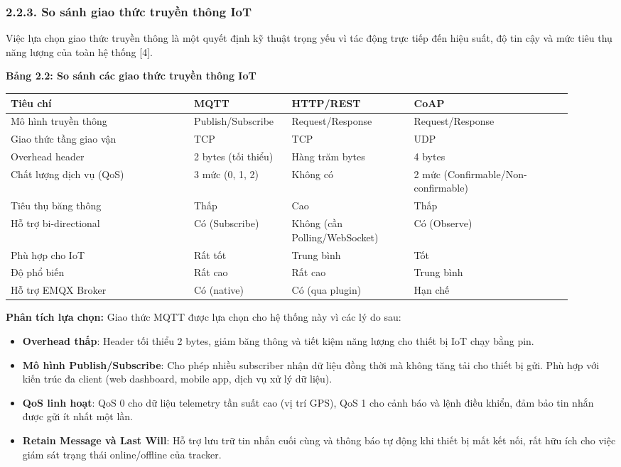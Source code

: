 \documentclass[13pt,a4paper]{extarticle}
\newcounter{none} %
\newcommand{\thesislongtableorignewline}{}
\let\thesislongtableorignewline\\
\renewcommand{\\}{\thesislongtableorignewline\hline}%
\let\\\thesislongtableorignewline
\newcommand{\thesistabletitle}[1]{%
  \begin{center}\textbf{#1}\end{center}%
}
\providecommand{\tightlist}{%
  \setlength{\itemsep}{0pt}\setlength{\parskip}{0pt}}
\begin{document}
\subsubsection{2.2.3. So sánh giao thức truyền thông
IoT}\label{223-so-suxe1nh-giao-thux1ee9c-truyux1ec1n-thuxf4ng-iot}

Việc lựa chọn giao thức truyền thông là một quyết định kỹ thuật trọng
yếu vì tác động trực tiếp đến hiệu suất, độ tin cậy và mức tiêu thụ năng
lượng của toàn hệ thống {[}4{]}.

\thesistabletitle{Bảng 2.2: So sánh các giao thức truyền thông IoT}

{\def\LTcaptype{none} %
\begin{longtable}{|p{0.30\linewidth}|p{0.16\linewidth}|p{0.20\linewidth}|p{0.26\linewidth}|}
\hline \textbf{Tiêu chí} & \textbf{MQTT} & \textbf{HTTP/REST} & \textbf{CoAP} \\
\hline
\endhead
\hline
\endlastfoot
Mô hình truyền thông & Publish/Subscribe & Request/Response &
Request/Response \\
Giao thức tầng giao vận & TCP & TCP & UDP \\
Overhead header & 2 bytes (tối thiểu) & Hàng trăm bytes & 4 bytes \\
Chất lượng dịch vụ (QoS) & 3 mức (0, 1, 2) & Không có & 2 mức
(Confirmable/Non-confirmable) \\
Tiêu thụ băng thông & Thấp & Cao & Thấp \\
Hỗ trợ bi-directional & Có (Subscribe) & Không (cần Polling/WebSocket) &
Có (Observe) \\
Phù hợp cho IoT & Rất tốt & Trung bình & Tốt \\
Độ phổ biến & Rất cao & Rất cao & Trung bình \\
Hỗ trợ EMQX Broker & Có (native) & Có (qua plugin) & Hạn chế \\
\end{longtable}
}

\textbf{Phân tích lựa chọn:} Giao thức MQTT được lựa chọn cho hệ thống
này vì các lý do sau:

\begin{itemize}
\tightlist
\item
  \textbf{Overhead thấp}: Header tối thiểu 2 bytes, giảm băng thông và
  tiết kiệm năng lượng cho thiết bị IoT chạy bằng pin.
\item
  \textbf{Mô hình Publish/Subscribe}: Cho phép nhiều subscriber nhận dữ
  liệu đồng thời mà không tăng tải cho thiết bị gửi. Phù hợp với kiến
  trúc đa client (web dashboard, mobile app, dịch vụ xử lý dữ liệu).
\item
  \textbf{QoS linh hoạt}: QoS 0 cho dữ liệu telemetry tần suất cao (vị
  trí GPS), QoS 1 cho cảnh báo và lệnh điều khiển, đảm bảo tin nhắn được
  gửi ít nhất một lần.
\item
  \textbf{Retain Message và Last Will}: Hỗ trợ lưu trữ tin nhắn cuối
  cùng và thông báo tự động khi thiết bị mất kết nối, rất hữu ích cho
  việc giám sát trạng thái online/offline của tracker.
\end{itemize}
\end{document}

